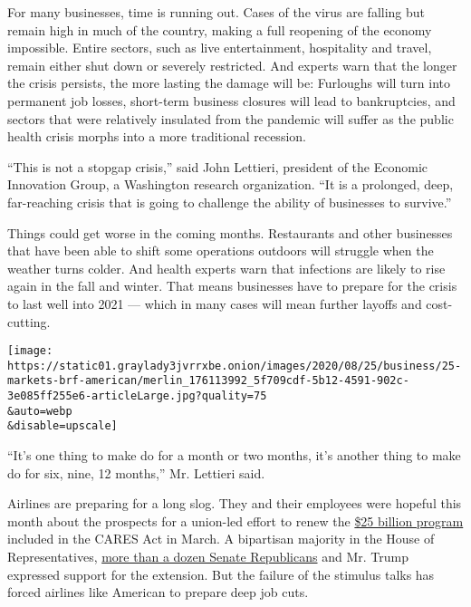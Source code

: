 For many businesses, time is running out. Cases of the virus are falling
but remain high in much of the country, making a full reopening of the
economy impossible. Entire sectors, such as live entertainment,
hospitality and travel, remain either shut down or severely restricted.
And experts warn that the longer the crisis persists, the more lasting
the damage will be: Furloughs will turn into permanent job losses,
short-term business closures will lead to bankruptcies, and sectors that
were relatively insulated from the pandemic will suffer as the public
health crisis morphs into a more traditional recession.

``This is not a stopgap crisis,'' said John Lettieri, president of the
Economic Innovation Group, a Washington research organization. ``It is a
prolonged, deep, far-reaching crisis that is going to challenge the
ability of businesses to survive.''

Things could get worse in the coming months. Restaurants and other
businesses that have been able to shift some operations outdoors will
struggle when the weather turns colder. And health experts warn that
infections are likely to rise again in the fall and winter. That means
businesses have to prepare for the crisis to last well into 2021 ---
which in many cases will mean further layoffs and cost-cutting.

\texttt{[image: https://static01.graylady3jvrrxbe.onion/images/2020/08/25/business/25-markets-brf-american/merlin\_176113992\_5f709cdf-5b12-4591-902c-3e085ff255e6-articleLarge.jpg?quality=75\\\&auto=webp\\\&disable=upscale]}

``It's one thing to make do for a month or two months, it's another
thing to make do for six, nine, 12 months,'' Mr. Lettieri said.

Airlines are preparing for a long slog. They and their employees were
hopeful this month about the prospects for a union-led effort to renew
the
\href{https://www.nytimes3xbfgragh.onion/live/2020/08/05/business/stock-market-today-coronavirus/republican-senators-back-an-extension-of-support-for-airlines}{\$25
billion program} included in the CARES Act in March. A bipartisan
majority in the House of Representatives,
\href{https://www.nytimes3xbfgragh.onion/live/2020/08/05/business/stock-market-today-coronavirus\#republican-senators-back-an-extension-of-support-for-airlines}{more
than a dozen Senate Republicans} and Mr. Trump expressed support for the
extension. But the failure of the stimulus talks has forced airlines
like American to prepare deep job cuts.

